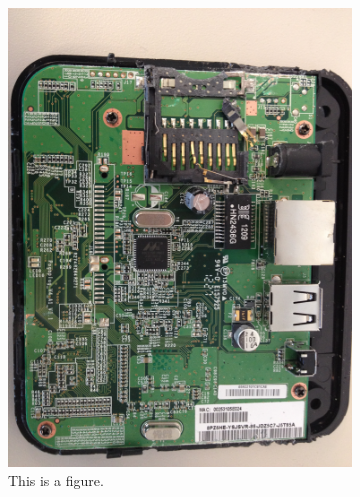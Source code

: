 \begin{figure}[htb]
\centering
\begin{subfigure}[b]{.3\textwidth}
  \includegraphics[width=\textwidth]{safeplug_top}
  \caption{This is a figure.}
  \label{fig:top}
\end{subfigure}%
\qquad
\begin{subfigure}[b]{.3\textwidth}

\end{subfigure}
\end{figure}
